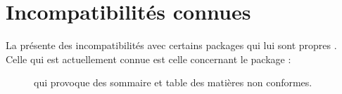 \chapter{Incompatibilités connues}
\label{cha:incomp-conn}

La \yatcl{} présente des incompatibilités avec certains packages qui lui sont
propres . Celle qui est actuellement connue est celle concernant le
package :
\begin{description}
\item[] qui provoque des sommaire et table des matières
  non conformes.
\end{description}
